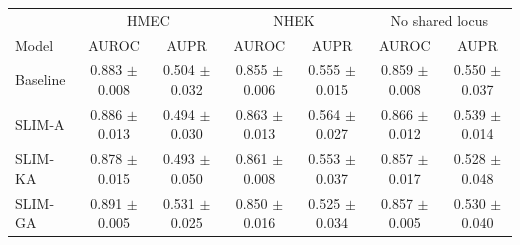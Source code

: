 \begin{tabular}{lcccccc}
\toprule
 & \multicolumn{2}{c}{HMEC} & \multicolumn{2}{c}{NHEK} & \multicolumn{2}{c}{No shared locus} \\
Model & AUROC & AUPR & AUROC & AUPR & AUROC & AUPR \\
\midrule
Baseline & 0.883 $\pm$ 0.008 & 0.504 $\pm$ 0.032 & 0.855 $\pm$ 0.006 & 0.555 $\pm$ 0.015 & 0.859 $\pm$ 0.008 & 0.550 $\pm$ 0.037 \\
SLIM-A & 0.886 $\pm$ 0.013 & 0.494 $\pm$ 0.030 & 0.863 $\pm$ 0.013 & 0.564 $\pm$ 0.027 & 0.866 $\pm$ 0.012 & 0.539 $\pm$ 0.014 \\
SLIM-KA & 0.878 $\pm$ 0.015 & 0.493 $\pm$ 0.050 & 0.861 $\pm$ 0.008 & 0.553 $\pm$ 0.037 & 0.857 $\pm$ 0.017 & 0.528 $\pm$ 0.048 \\
SLIM-GA & 0.891 $\pm$ 0.005 & 0.531 $\pm$ 0.025 & 0.850 $\pm$ 0.016 & 0.525 $\pm$ 0.034 & 0.857 $\pm$ 0.005 & 0.530 $\pm$ 0.040 \\
\bottomrule
\end{tabular}
